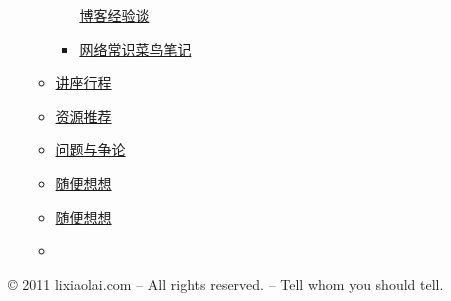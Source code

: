 \begin{itemize}[<+->]
\begin{itemize}[<+->]
\begin{itemize}[<+->]
      \href{/web/20131011170823/http://wordpress.lixiaolai.com/archives/category/computer-related/blogging-experience}{博客经验谈}
    \item
      \href{/web/20131011170823/http://wordpress.lixiaolai.com/archives/category/computer-related/computer-and-internet-common-sense-for-dummies}{网络常识菜鸟笔记}
    \end{itemize}
  \item
    \href{/web/20131011170823/http://wordpress.lixiaolai.com/archives/category/lecture-schedule}{讲座行程}
  \item
    \href{/web/20131011170823/http://wordpress.lixiaolai.com/archives/category/resouces-recommended}{资源推荐}
  \item
    \href{/web/20131011170823/http://wordpress.lixiaolai.com/archives/category/isssue-and-argumentation}{问题与争论}
  \item
    \href{/web/20131011170823/http://wordpress.lixiaolai.com/archives/category/scratches}{随便想想}
  \item
    \href{/web/20131011170823/http://wordpress.lixiaolai.com/archives/category/\%e9\%9a\%8f\%e4\%be\%bf\%e6\%83\%b3\%e6\%83\%b3}{随便想想}
  \item
  \end{itemize}
\end{itemize}

© 2011 lixiaolai.com -- All rights reserved. -- Tell whom you should
tell.
